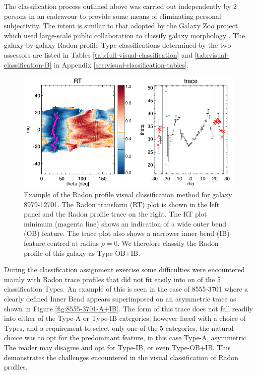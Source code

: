 The classification process outlined above was carried out independently by 2 persons in an endeavour to provide some means of eliminating personal subjectivity. The intent is similar  to that adopted by the Galaxy Zoo project which used large-scale public collaboration to classify galaxy morphology \citep{2017MNRAS.464.4176W}. The galaxy-by-galaxy Radon profile Type classifications determined by the two assessors are listed in Tables \ref{tab:full-visual-classification} and \ref{tab:visual-classification-B} in Appendix \ref{sec:visual-classification-tables}.

\begin{figure}
    \centering
    \includegraphics[width=\columnwidth]{images/RadonPlots/RT-SNIPS-NEW/8979-12701-VA-OB+IB.png}
    \caption[Example of the Radon profile visual classification of galaxy 8979-12701]{Example of the Radon profile visual classification method for galaxy 8979-12701. The Radon transform (RT) plot is shown in the left panel and the Radon profile trace on the right. The RT plot minimum (magenta line) shows an indication of a wide outer bend (OB) feature. The trace plot also shows a narrower inner bend (IB) feature centred at radius $\rho=0$. We therefore classify the Radon profile of this galaxy as Type-OB+IB.}
    \label{fig:OB+IB}
\end{figure}

During the classification assignment exercise  some difficulties were encountered mainly with Radon trace profiles that did not fit easily into on of the 5 classification Types. An example of this is seen in the case of 8555-3701 where a clearly defined Inner Bend appears superimposed on an asymmetric trace as shown in Figure \ref{fig:8555-3701-A+IB}. The form of this trace does not fall readily into either of the Type-A or Type-IB categories, however faced with a choice of Types, and a requirement to select only one of the 5 categories, the natural choice was to opt for the predominant feature, in this case Type-A, asymmetric. The reader may disagree and opt for Type-IB, or even Type-OB+IB. This demonstrates the challenges encountered in the visual classification of Radon profiles.

